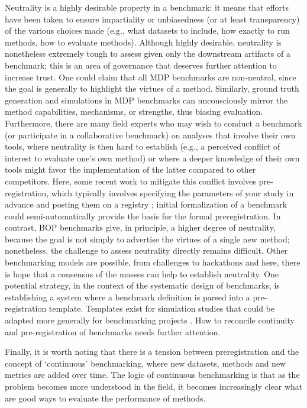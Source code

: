 \documentclass[11pt]{article}
\begin{document}
Neutrality is a highly desirable property in a benchmark: it means that efforts have been taken to ensure impartiality or unbiasedness (or at least transparency) of the various choices made (e.g., what datasets to include, how exactly to run methods, how to evaluate methods). Although highly desirable, neutrality is nonetheless extremely tough to assess given only the downstream artifacts of a benchmark; this is an area of governance that deserves further attention to increase trust. One could claim that all MDP benchmarks are non-neutral, since the goal is generally to highlight the virtues of a method. Similarly, ground truth generation and simulations in MDP benchmarks can unconsciously mirror the method capabilities, mechanisms, or strengths, thus biasing evaluation. Furthermore, there are many field experts who may wish to conduct a benchmark (or participate in a collaborative benchmark) on analyses that involve their own tools, where neutrality is then hard to establish (e.g., a perceived conflict of interest to evaluate one's own method) or where a deeper knowledge of their own tools might favor the implementation of the latter compared to other competitors. Here, some recent work to mitigate this conflict involves pre-registration, which typically involves specifying the parameters of your study in advance and posting them on a registry \cite{Sullivan2019-wh, Olevska2021-if}; initial formalization of a benchmark could semi-automatically provide the basis for the formal preregistration. In contrast, BOP benchmarks give, in principle, a higher degree of neutrality, because the goal is not simply to advertise the virtues of a single new method; nonetheless, the challenge to assess neutrality directly remains difficult. Other benchmarking models are possible, from challenges to hackathons and here, there is hope that a consensus of the masses can help to establish neutrality. One potential strategy, in the context of the systematic design of benchmarks, is establishing a system where a benchmark definition is parsed into a pre-registration template. Templates exist for simulation studies that could be adapted more generally for benchmarking projects \cite{Siepe2023-tz}. How to reconcile continuity and pre-registration of benchmarks needs further attention.

Finally, it is worth noting that there is a tension between preregistration and the concept of `continuous' benchmarking, where new datasets, methods and new metrics are added over time. The logic of continuous benchmarking is that as the problem becomes more understood in the field, it becomes increasingly clear what are good ways to evaluate the performance of methods. 
\end{document}
